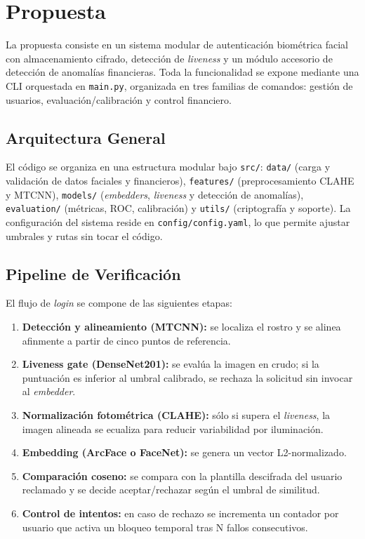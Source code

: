 \section{Propuesta}
\label{sec:propuesta}

La propuesta consiste en un sistema modular de autenticación biométrica facial con almacenamiento cifrado, detección de \textit{liveness} y un módulo accesorio de detección de anomalías financieras. Toda la funcionalidad se expone mediante una CLI orquestada en \texttt{main.py}, organizada en tres familias de comandos: gestión de usuarios, evaluación/calibración y control financiero.

\subsection{Arquitectura General}
\label{subsec:arquitectura}

El código se organiza en una estructura modular bajo \texttt{src/}: \texttt{data/} (carga y validación de datos faciales y financieros), \texttt{features/} (preprocesamiento CLAHE y MTCNN), \texttt{models/} (\textit{embedders}, \textit{liveness} y detección de anomalías), \texttt{evaluation/} (métricas, ROC, calibración) y \texttt{utils/} (criptografía y soporte). La configuración del sistema reside en \texttt{config/config.yaml}, lo que permite ajustar umbrales y rutas sin tocar el código.

\subsection{Pipeline de Verificación}
\label{subsec:pipeline}

El flujo de \textit{login} se compone de las siguientes etapas:

\begin{enumerate}[leftmargin=*]
    \item \textbf{Detección y alineamiento (MTCNN):} se localiza el rostro y se alinea afinmente a partir de cinco puntos de referencia.
    \item \textbf{Liveness gate (DenseNet201):} se evalúa la imagen en crudo; si la puntuación es inferior al umbral calibrado, se rechaza la solicitud sin invocar al \textit{embedder}.
    \item \textbf{Normalización fotométrica (CLAHE):} sólo si supera el \textit{liveness}, la imagen alineada se ecualiza para reducir variabilidad por iluminación.
    \item \textbf{Embedding (ArcFace o FaceNet):} se genera un vector L2-normalizado.
    \item \textbf{Comparación coseno:} se compara con la plantilla descifrada del usuario reclamado y se decide aceptar/rechazar según el umbral de similitud.
    \item \textbf{Control de intentos:} en caso de rechazo se incrementa un contador por usuario que activa un bloqueo temporal tras N fallos consecutivos.
\end{enumerate}

